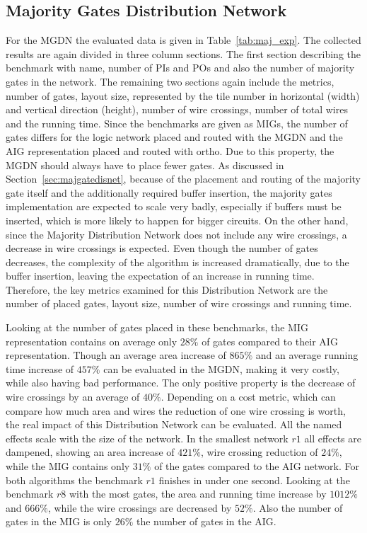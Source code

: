 \newpage
\subsection{Majority Gates Distribution Network}
For the MGDN the evaluated data is given in Table~\ref{tab:maj_exp}. The collected results are again divided in three column sections. The first section describing the benchmark with name, number of PIs and POs and also the number of majority gates in the network. The remaining two sections again include the metrics, number of gates, layout size, represented by the tile number in horizontal (width) and vertical direction (height), number of wire crossings, number of total wires and the running time. Since the benchmarks are given as MIGs, the number of gates differs for the logic network placed and routed with the MGDN and the AIG representation placed and routed with ortho. 
Due to this property, the MGDN should always have to place fewer gates. As discussed in Section~\ref{sec:majgatedisnet}, because of the placement and routing of the majority gate itself and the additionally required buffer insertion, the majority gates implementation are expected to scale very badly, especially if buffers must be inserted, which is more likely to happen for bigger circuits. On the other hand, since the Majority Distribution Network does not include any wire crossings, a decrease in wire crossings is expected. Even though the number of gates decreases, the complexity of the algorithm is increased dramatically, due to the buffer insertion, leaving the expectation of an increase in running time. Therefore, the key metrics examined for this Distribution Network are the number of placed gates, layout size, number of wire crossings and running time.

Looking at the number of gates placed in these benchmarks, the MIG representation contains on average only $28\%$ of gates compared to their AIG representation. Though an average area increase of $865\%$ and an average running time increase of $457\%$ can be evaluated in the MGDN, making it very costly, while also having bad performance. The only positive property is the decrease of wire crossings by an average of $40\%$. Depending on a cost metric, which can compare how much area and wires the reduction of one wire crossing is worth, the real impact of this Distribution Network can be evaluated. All the named effects scale with the size of the network. In the smallest network $r1$ all effects are dampened, showing an area increase of $421\%$, wire crossing reduction of $24\%$, while the MIG contains only $31\%$ of the gates compared to the AIG network. For both algorithms the benchmark $r1$ finishes in under one second. Looking at the benchmark $r8$ with the most gates, the area and running time increase by $1012\%$ and $666\%$, while the wire crossings are decreased by $52\%$. Also the number of gates in the MIG is only $26\%$ the number of gates in the AIG.


